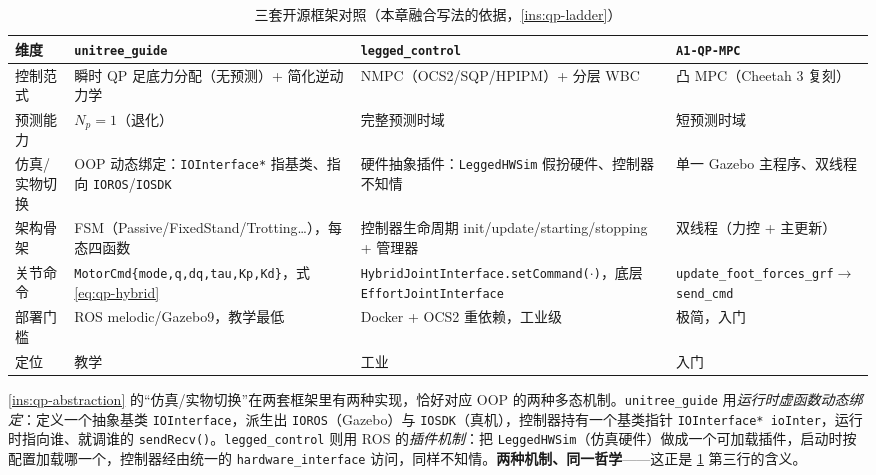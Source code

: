\begin{table}[H]\centering\small
\caption{三套开源框架对照（本章融合写法的依据，\cref{ins:qp-ladder}）}
\begin{tabular}{p{} p{} p{} p{}}
\toprule
维度 & \texttt{unitree\_guide}\cite{unitree2023quadruped} & \texttt{legged\_control}\cite{sleiman2021unified} & \texttt{A1-QP-MPC}\cite{dicarlo2018cheetah} \\
\midrule
控制范式 & 瞬时 QP 足底力分配（无预测）+ 简化逆动力学 & NMPC（OCS2/SQP/HPIPM）+ 分层 WBC & 凸 MPC（Cheetah 3 复刻）\\
预测能力 & $N_p{=}1$（退化）& 完整预测时域 & 短预测时域 \\
仿真/实物切换 & OOP 动态绑定：\texttt{IOInterface*} 指基类、指向 \texttt{IOROS}/\allowbreak\texttt{IOSDK} & 硬件抽象插件：\texttt{LeggedHWSim} 假扮硬件、控制器不知情 & 单一 Gazebo 主程序、双线程 \\
架构骨架 & FSM（Passive/FixedStand/Trotting\dots），每态四函数 & 控制器生命周期 init/update/starting/stopping + 管理器 & 双线程（力控 + 主更新）\\
关节命令 & \texttt{MotorCmd\{mode,q,dq,tau,Kp,Kd\}}，式 \cref{eq:qp-hybrid} & \texttt{HybridJointInterface.\allowbreak setCommand($\cdot$)}，底层 \texttt{EffortJointInterface} & \texttt{update\_foot\_forces\_grf}$\to$\texttt{send\_cmd} \\
部署门槛 & ROS melodic/Gazebo9，教学最低 & Docker + OCS2 重依赖，工业级 & 极简，入门 \\
定位 & 教学 & 工业 & 入门 \\
\bottomrule
\end{tabular}
\label{tab:qp-frameworks}
\end{table}

\begin{insight}\label{ins:qp-two-impl}
\cref{ins:qp-abstraction} 的“仿真/实物切换”在两套框架里有两种实现，恰好对应 OOP 的两种多态机制。\texttt{unitree\_guide} 用\emph{运行时虚函数动态绑定}：定义一个抽象基类 \texttt{IOInterface}，派生出 \texttt{IOROS}（Gazebo）与 \texttt{IOSDK}（真机），控制器持有一个基类指针 \texttt{IOInterface* ioInter}，运行时指向谁、就调谁的 \texttt{sendRecv()}。\texttt{legged\_control} 则用 ROS 的\emph{插件机制}：把 \texttt{LeggedHWSim}（仿真硬件）做成一个可加载插件，启动时按配置加载哪一个，控制器经由统一的 \texttt{hardware\_interface} 访问，同样不知情。\textbf{两种机制、同一哲学}——这正是 \cref{tab:qp-frameworks} 第三行的含义。
\end{insight}

